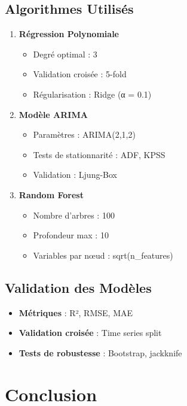 \documentclass[12pt,a4paper]{article}
\begin{document}
\subsection{Algorithmes Utilisés}
\begin{enumerate}
    \item \textbf{Régression Polynomiale}
    \begin{itemize}
        \item Degré optimal : 3
        \item Validation croisée : 5-fold
        \item Régularisation : Ridge (α = 0.1)
    \end{itemize}
    
    \item \textbf{Modèle ARIMA}
    \begin{itemize}
        \item Paramètres : ARIMA(2,1,2)
        \item Tests de stationnarité : ADF, KPSS
        \item Validation : Ljung-Box
    \end{itemize}
    
    \item \textbf{Random Forest}
    \begin{itemize}
        \item Nombre d'arbres : 100
        \item Profondeur max : 10
        \item Variables par nœud : sqrt(n\_features)
    \end{itemize}
\end{enumerate}

\subsection{Validation des Modèles}
\begin{itemize}
    \item \textbf{Métriques} : R², RMSE, MAE
    \item \textbf{Validation croisée} : Time series split
    \item \textbf{Tests de robustesse} : Bootstrap, jackknife
\end{itemize}

\newpage

\section{Conclusion}
\end{document}
